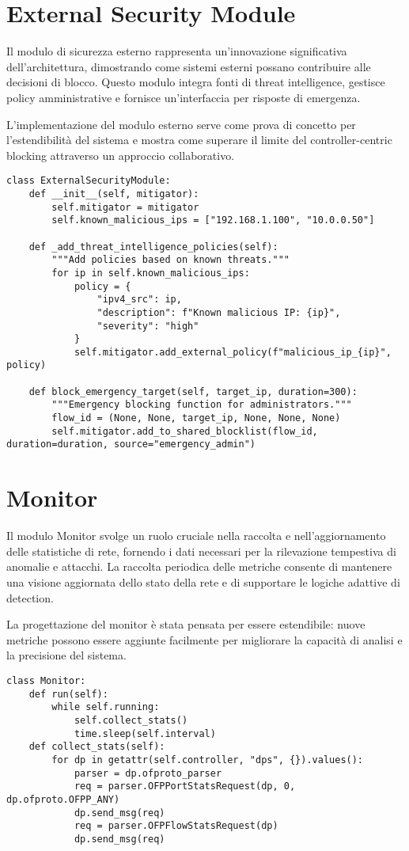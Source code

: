 \section{External Security Module}
Il modulo di sicurezza esterno rappresenta un'innovazione significativa dell'architettura, dimostrando come sistemi esterni possano contribuire alle decisioni di blocco. Questo modulo integra fonti di threat intelligence, gestisce policy amministrative e fornisce un'interfaccia per risposte di emergenza.\par
L'implementazione del modulo esterno serve come prova di concetto per l'estendibilità del sistema e mostra come superare il limite del controller-centric blocking attraverso un approccio collaborativo.
\begin{verbatim}
class ExternalSecurityModule:
    def __init__(self, mitigator):
        self.mitigator = mitigator
        self.known_malicious_ips = ["192.168.1.100", "10.0.0.50"]
        
    def _add_threat_intelligence_policies(self):
        """Add policies based on known threats."""
        for ip in self.known_malicious_ips:
            policy = {
                "ipv4_src": ip,
                "description": f"Known malicious IP: {ip}",
                "severity": "high"
            }
            self.mitigator.add_external_policy(f"malicious_ip_{ip}", policy)
            
    def block_emergency_target(self, target_ip, duration=300):
        """Emergency blocking function for administrators."""
        flow_id = (None, None, target_ip, None, None, None)
        self.mitigator.add_to_shared_blocklist(flow_id, duration=duration, source="emergency_admin")
\end{verbatim}

\section{Monitor}
Il modulo Monitor svolge un ruolo cruciale nella raccolta e nell'aggiornamento delle statistiche di rete, fornendo i dati necessari per la rilevazione tempestiva di anomalie e attacchi. La raccolta periodica delle metriche consente di mantenere una visione aggiornata dello stato della rete e di supportare le logiche adattive di detection.\par
La progettazione del monitor è stata pensata per essere estendibile: nuove metriche possono essere aggiunte facilmente per migliorare la capacità di analisi e la precisione del sistema.
\begin{verbatim}
class Monitor:
    def run(self):
        while self.running:
            self.collect_stats()
            time.sleep(self.interval)
    def collect_stats(self):
        for dp in getattr(self.controller, "dps", {}).values():
            parser = dp.ofproto_parser
            req = parser.OFPPortStatsRequest(dp, 0, dp.ofproto.OFPP_ANY)
            dp.send_msg(req)
            req = parser.OFPFlowStatsRequest(dp)
            dp.send_msg(req)
\end{verbatim}

